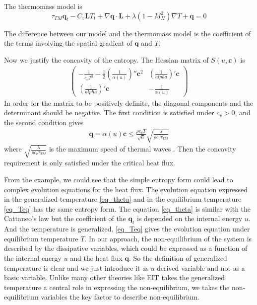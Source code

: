 \documentclass[a4paper]{article}
\begin{document}
The thermomass model is 
\begin{equation}
\tau_{TM} \mathbf{q}_t-C_v \mathbf{L}T_t+\nabla \mathbf{q} \cdot \mathbf{L}+\lambda(1-M_H^2)\nabla T+\mathbf{q}=0
\end{equation}

The difference between our model and the thermomass model is the coefficient of the terms involving the spatial gradient of $\mathbf{q}$ and $T$.

Now we justify the concavity of the entropy. The Hessian matrix of $S(u,\mathbf{c})$ is
\begin{eqnarray}
\left( \begin{array}{ll} -\frac{1}{c_v T^2}-\frac{1}{2}(\frac{1}{\alpha(u)})'' \mathbf{c}^2 & (\frac{1}{alpha})'\mathbf{c} \\ (\frac{1}{alpha})'\mathbf{c} & -\frac{1}{\alpha(u)} \end{array} \right)
\end{eqnarray}
In order for the matrix to be positively definite, the diagonal components and the determinant should be negative. The first condition is satisfied under $c_v>0$, and the second condition gives
\begin{eqnarray}
\mathbf{q}=\alpha(u)\mathbf{c} \le \frac{\rho c_v T}{\sqrt{6}} \sqrt{\frac{\lambda}{\rho c_v \tau_{TM}}}
\end{eqnarray}
where $\sqrt{\frac{\lambda}{\rho c_v \tau_{TM}}}$ is the maximum speed of thermal waves \cite{Jou1996extended}. Then the concavity requirement is only satisfied under the critical heat flux.


From the example, we could see that the simple entropy form could lead to complex evolution equations for the heat flux. The evolution equation expressed in the generalized temperature \eqref{eq_theta} and in the equilibrium temperature \eqref{eq_Teq} has the same entropy form. The equation  \eqref{eq_theta} is similar with the Cattaneo's law but the coefficient of the $\mathbf{q}_t$ is depended on the internal energy $u$. And the temperature is generalized. \eqref{eq_Teq} gives the evolution equation under equilibrium temperature $T$. In our approach, the non-equilibrium of the system is described by the dissipative variables, which could be expressed as a function of the internal energy $u$ and the heat flux $\mathbf{q}$. So the definition of generalized temperature is clear and we just introduce it as a derived variable and not as a basic variable. Unlike many other theories like EIT takes the generalized temperature a central role in expressing the non-equilibrium, we takes the non-equilibrium variables the key factor to describe non-equilibrium.
\end{document}
